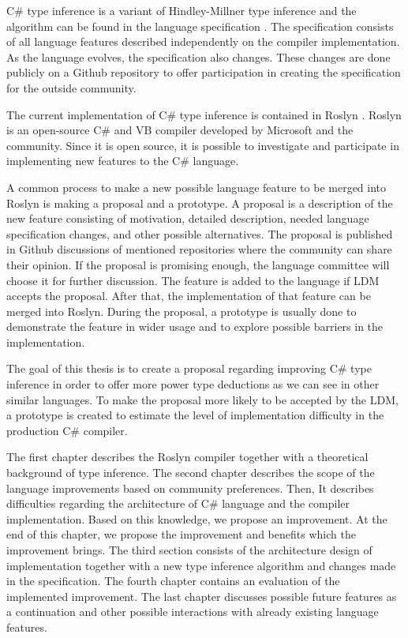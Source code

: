 C\# type inference is a variant of Hindley-Millner type inference and the algorithm can be found in the language specification \cite{online:langSpec}.
The specification consists of all language features described independently on the compiler implementation.
As the language evolves, the specification also changes.
These changes are done publicly on a Github repository \cite{online:langRepo} to offer participation in creating the specification for the outside community.

The current implementation of C\# type inference is contained in Roslyn \cite{online:roslynRepo}.
Roslyn is an open-source C\# and VB compiler developed by Microsoft and the community.
Since it is open source, it is possible to investigate and participate in implementing new features to the C\# language.

A common process to make a new possible language feature to be merged into Roslyn is making a proposal and a prototype.
A proposal is a description of the new feature consisting of motivation, detailed description, needed language specification changes, and other possible alternatives.
The proposal is published in Github discussions of mentioned repositories where the community can share their opinion.
If the proposal is promising enough, the language committee will choose it for further discussion.
The feature is added to the language if \ac{LDM} accepts the proposal.
After that, the implementation of that feature can be merged into Roslyn.
During the proposal, a prototype is usually done to demonstrate the feature in wider usage and to explore possible barriers in the implementation.

The goal of this thesis is to create a proposal regarding improving C\# type inference in order to offer more power type deductions as we can see in other similar languages.
To make the proposal more likely to be accepted by the \ac{LDM}, a prototype is created to estimate the level of implementation difficulty in the production C\# compiler.

The first chapter describes the Roslyn compiler together with a theoretical background of type inference.
The second chapter describes the scope of the language improvements based on community preferences.
Then, It describes difficulties regarding the architecture of C\# language and the compiler implementation.
Based on this knowledge, we propose an improvement.
At the end of this chapter, we propose the improvement and benefits which the improvement brings.
The third section consists of the architecture design of implementation together with a new type inference algorithm and changes made in the specification.
The fourth chapter contains an evaluation of the implemented improvement.
The last chapter discusses possible future features as a continuation and other possible interactions with already existing language features.
